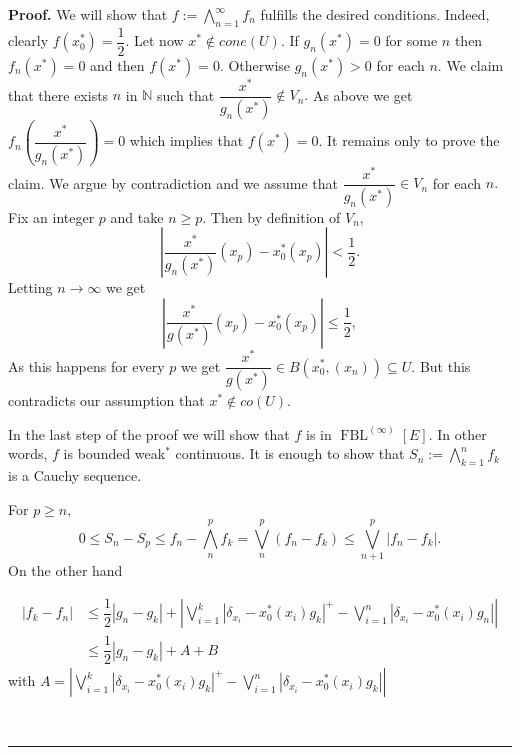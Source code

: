 \documentclass[12pt]{article}%
\newenvironment{proof}[1][Proof]{\noindent\textbf{#1.} }{\ \rule{0.5em}{0.5em}}
\begin{document}
\begin{proof}
We will show that $f:=\bigwedge\limits_{n=1}^{\infty}f_{n}$ fulfills the
desired conditions. Indeed, clearly $f\left(  x_{0}^{\ast}\right)  =\dfrac
{1}{2}.$ Let now $x^{\ast}\notin cone\left(  U\right)  .$ If $g_{n}\left(
x^{\ast}\right)  =0$ for some $n$ then $f_{n}\left(  x^{\ast}\right)  =0$ and
then $f\left(  x^{\ast}\right)  =0.$ Otherwise $g_{n}\left(  x^{\ast}\right)
>0$ for each $n.$ We claim that there exists $n$ in $\mathbb{N}$ such that
$\dfrac{x^{\ast}}{g_{n}\left(  x^{\ast}\right)  }\notin V_{n}.$ As above we
get $f_{n}\left(  \dfrac{x^{\ast}}{g_{n}\left(  x^{\ast}\right)  }\right)  =0$
which implies that $f\left(  x^{\ast}\right)  =0.$ It remains only to prove
the claim. We argue by contradiction and we assume that $\dfrac{x^{\ast}%
}{g_{n}\left(  x^{\ast}\right)  }\in V_{n}$ for each $n.$ Fix an integer $p$
and take $n\geq p.$ Then by definition of $V_{n},$
\[
\left\vert \dfrac{x^{\ast}}{g_{n}\left(  x^{\ast}\right)  }\left(
x_{p}\right)  -x_{0}^{\ast}\left(  x_{p}\right)  \right\vert <\dfrac{1}{2}.
\]
Letting $n\longrightarrow\infty$ we get%
\[
\left\vert \dfrac{x^{\ast}}{g\left(  x^{\ast}\right)  }\left(  x_{p}\right)
-x_{0}^{\ast}\left(  x_{p}\right)  \right\vert \leq\dfrac{1}{2},
\]
As this happens for every $p$ we get $\dfrac{x^{\ast}}{g\left(  x^{\ast
}\right)  }\in B\left(  x_{0}^{\ast},\left(  x_{n}\right)  \right)  \subseteq
U.$ But this contradicts our assumption that $x^{\ast}\notin co\left(
U\right)  .$

In the last step of the proof we will show that $f$ is in $\operatorname*{FBL}%
\nolimits^{\left(  \infty\right)  }\left[  E\right]  .$ In other words, $f$ is
bounded weak$^{\ast}$ continuous. It is enough to show that $S_{n}%
:=\bigwedge\limits_{k=1}^{n}f_{k}$ is a Cauchy sequence.

For $p\geq n,$
\[
0\leq S_{n}-S_{p}\leq f_{n}-\bigwedge\limits_{n}^{p}f_{k}=\bigvee
\limits_{n}^{p}\left(  f_{n}-f_{k}\right)  \leq\bigvee\limits_{n+1}%
^{p}\left\vert f_{n}-f_{k}\right\vert .
\]
On the other hand%

\begin{align*}
\left\vert f_{k}-f_{n}\right\vert  &  \leq\dfrac{1}{2}\left\vert g_{n}%
-g_{k}\right\vert +\left\vert \bigvee\limits_{i=1}^{k}\left\vert \delta
_{x_{i}}-x_{0}^{\ast}\left(  x_{i}\right)  g_{k}\right\vert ^{+}%
-\bigvee\limits_{i=1}^{n}\left\vert \delta_{x_{i}}-x_{0}^{\ast}\left(
x_{i}\right)  g_{n}\right\vert \right\vert \\
&  \leq\dfrac{1}{2}\left\vert g_{n}-g_{k}\right\vert +A+B
\end{align*}
with $A=\left\vert \bigvee\limits_{i=1}^{k}\left\vert \delta_{x_{i}}%
-x_{0}^{\ast}\left(  x_{i}\right)  g_{k}\right\vert ^{+}-\bigvee
\limits_{i=1}^{n}\left\vert \delta_{x_{i}}-x_{0}^{\ast}\left(  x_{i}\right)
g_{k}\right\vert \right\vert $


\end{proof}
\end{document}
